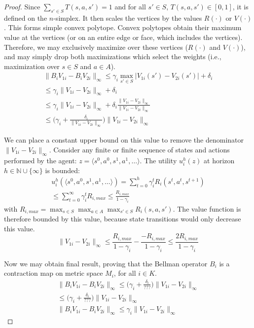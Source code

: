 \begin{proof}
Since $\sum_{s' \in S} T(s, a, s') = 1$ and for all $s' \in S$, $T(s, a, s') \in [0, 1]$, it is defined on the $n$-simplex. It then scales the vertices by the values $R(\cdot)$ or $V(\cdot)$. This forms simple convex polytope. Convex polytopes obtain their maximum value at the vertices (or on an entire edge or face, which includes the vertices). Therefore, we may exclusively maximize over these vertices ($R(\cdot)$ and $V(\cdot)$), and may simply drop both maximizations which select the weights (i.e., maximization over $s \in S$ and $a \in A$).
\begin{multline*}
    \| B_i V_{1i} - B_i V_{2i} \|_\infty \leq \gamma_i \max_{s' \in S} \Big| V_{1i}(s') - V_{2i}(s') \Big| + \delta_i \\
        \leq \gamma_i \| V_{1i} - V_{2i} \|_\infty + \delta_i \\
        \leq \gamma_i \| V_{1i} - V_{2i} \|_\infty + \delta_i \frac{\| V_{1i} - V_{2i} \|_\infty}{\| V_{1i} - V_{2i} \|_\infty} \\
        \leq \Big( \gamma_i + \frac{\delta_i}{\| V_{1i} - V_{2i} \|_\infty} \Big) \| V_{1i} - V_{2i} \|_\infty
\end{multline*}

We can place a constant upper bound on this value to remove the denominator $\| V_{1i} - V_{2i} \|_\infty$. Consider any finite or finite sequence of states and actions performed by the agent: $z = \langle s^0, a^0, s^1, a^1, \ldots \rangle$. The utility $u_i^h(z)$ at horizon $h \in \mathbb{N} \cup \{ \infty \}$ is bounded:
\begin{multline*}
    u_i^h(\langle s^0, a^0, s^1, a^1, \ldots \rangle) = \sum_{t=0}^h \gamma_i^t R_i(s^t, a^t, s^{t+1}) \\
    \leq \sum_{t=0}^\infty \gamma_i^t R_{i,max} \leq \frac{R_{i,max}}{1 - \gamma_i}
\end{multline*}
with $R_{i,max} = \max_{s \in S} \max_{a \in A} \max_{s' \in S} R_i(s, a, s')$. The value function is therefore bounded by this value, because state transitions would only decrease this value.
\begin{equation*}
    \| V_{1i} - V_{2i} \|_\infty \leq \frac{R_{i,max}}{1 - \gamma_i} - \frac{-R_{i,max}}{1 - \gamma_i} \leq \frac{2 R_{i,max}}{1 - \gamma_i}
\end{equation*}

Now we may obtain final result, proving that the Bellman operator $B_i$ is a contraction map on metric space $M_i$, for all $i \in K$.
\begin{multline*}
    \| B_i V_{1i} - B_i V_{2i} \|_\infty \leq \Big( \gamma_i + \frac{\delta_i}{???} \Big) \| V_{1i} - V_{2i} \|_\infty \\
    \leq \Big( \gamma_i + \frac{\delta_i}{???} \Big) \| V_{1i} - V_{2i} \|_\infty \\
    \| B_i V_{1i} - B_i V_{2i} \|_\infty \leq \gamma_i \| V_{1i} - V_{2i} \|_\infty
\end{multline*}


\end{proof}

